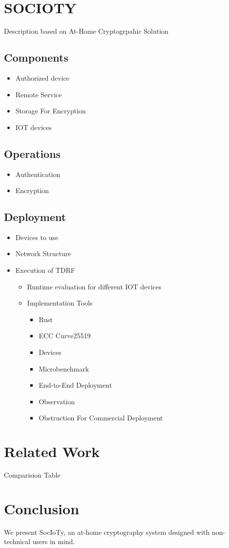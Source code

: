 \documentclass{article}
\begin{document}
\section{SOCIOTY}
Description based on At-Home Cryptogrpahic Solution
    \subsection{Components}
    \begin{itemize}
        \item Authorized device
        \item Remote Service
        \item Storage For Encryption
        \item IOT devices
    \end{itemize}

    \subsection{Operations}
    \begin{itemize}
        \item Authentication
        \item  Encryption
    \end{itemize}

    \subsection{Deployment}
    \begin{itemize}
        \item Devices to use
        \item  Network Structure
        \item Execution of TDRF
        \begin{itemize}
            \item Runtime evaluation for different IOT devices
            \item Implementation Tools
            \begin{itemize}
                \item Rust
                \item ECC Curve25519
                \item Devices
                \item Microbenchmark
                \item End-to-End Deployment
                \item Observation
                \item Obstruction For Commercial Deployment
            \end{itemize}
        \end{itemize}
    \end{itemize}

\section{Related Work}
Comparision Table

\section{Conclusion}
We present SocIoTy, an at-home cryptography system designed
with non-technical users in mind. 
\end{document}
